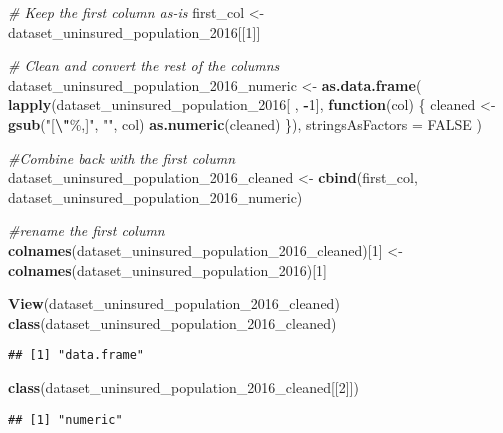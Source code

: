 \documentclass[
]{article}
\newenvironment{Shaded}{\begin{snugshade}}{\end{snugshade}}
\newcommand{\AttributeTok}[1]{\textcolor[rgb]{0.13,0.29,0.53}{#1}}
\newcommand{\CommentTok}[1]{\textcolor[rgb]{0.56,0.35,0.01}{\textit{#1}}}
\newcommand{\ConstantTok}[1]{\textcolor[rgb]{0.56,0.35,0.01}{#1}}
\newcommand{\ControlFlowTok}[1]{\textcolor[rgb]{0.13,0.29,0.53}{\textbf{#1}}}
\newcommand{\DecValTok}[1]{\textcolor[rgb]{0.00,0.00,0.81}{#1}}
\newcommand{\FunctionTok}[1]{\textcolor[rgb]{0.13,0.29,0.53}{\textbf{#1}}}
\newcommand{\NormalTok}[1]{#1}
\newcommand{\OtherTok}[1]{\textcolor[rgb]{0.56,0.35,0.01}{#1}}
\newcommand{\SpecialCharTok}[1]{\textcolor[rgb]{0.81,0.36,0.00}{\textbf{#1}}}
\newcommand{\StringTok}[1]{\textcolor[rgb]{0.31,0.60,0.02}{#1}}
\begin{document}
\begin{Shaded}
\begin{Highlighting}[]
\CommentTok{\# Keep the first column as{-}is}
\NormalTok{first\_col }\OtherTok{\textless{}{-}}\NormalTok{ dataset\_uninsured\_population\_2016[[}\DecValTok{1}\NormalTok{]]}

\CommentTok{\# Clean and convert the rest of the columns}
\NormalTok{dataset\_uninsured\_population\_2016\_numeric }\OtherTok{\textless{}{-}} \FunctionTok{as.data.frame}\NormalTok{(}
  \FunctionTok{lapply}\NormalTok{(dataset\_uninsured\_population\_2016[ , }\SpecialCharTok{{-}}\DecValTok{1}\NormalTok{], }\ControlFlowTok{function}\NormalTok{(col) \{}
\NormalTok{    cleaned }\OtherTok{\textless{}{-}} \FunctionTok{gsub}\NormalTok{(}\StringTok{"[}\SpecialCharTok{\textbackslash{}"}\StringTok{\%,]"}\NormalTok{, }\StringTok{""}\NormalTok{, col)}
    \FunctionTok{as.numeric}\NormalTok{(cleaned)}
\NormalTok{  \}),}
  \AttributeTok{stringsAsFactors =} \ConstantTok{FALSE}
\NormalTok{)}

\CommentTok{\#Combine back with the first column}
\NormalTok{dataset\_uninsured\_population\_2016\_cleaned }\OtherTok{\textless{}{-}} \FunctionTok{cbind}\NormalTok{(first\_col, dataset\_uninsured\_population\_2016\_numeric)}

\CommentTok{\#rename the first column}
\FunctionTok{colnames}\NormalTok{(dataset\_uninsured\_population\_2016\_cleaned)[}\DecValTok{1}\NormalTok{] }\OtherTok{\textless{}{-}} \FunctionTok{colnames}\NormalTok{(dataset\_uninsured\_population\_2016)[}\DecValTok{1}\NormalTok{]}

\FunctionTok{View}\NormalTok{(dataset\_uninsured\_population\_2016\_cleaned)}
\FunctionTok{class}\NormalTok{(dataset\_uninsured\_population\_2016\_cleaned)}
\end{Highlighting}
\end{Shaded}

\begin{verbatim}
## [1] "data.frame"
\end{verbatim}

\begin{Shaded}
\begin{Highlighting}[]
\FunctionTok{class}\NormalTok{(dataset\_uninsured\_population\_2016\_cleaned[[}\DecValTok{2}\NormalTok{]])}
\end{Highlighting}
\end{Shaded}

\begin{verbatim}
## [1] "numeric"
\end{verbatim}
\end{document}

